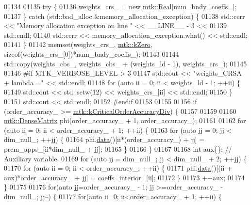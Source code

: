 \begin{DoxyCode}
{{01134 
01135   \textcolor{keywordflow}{try} \{
01136     weights\_crs\_ = \textcolor{keyword}{new} \hyperlink{group__c01-roots_gac080bbbf5cbb5502c9f00405f894857d}{mtk::Real}[num\_bndy\_coeffs\_];
01137   \} \textcolor{keywordflow}{catch} (std::bad\_alloc &memory\_allocation\_exception) \{
01138     std::cerr << \textcolor{stringliteral}{"Memory allocation exception on line "} << \_\_LINE\_\_ - 3 <<
01139       std::endl;
01140     std::cerr << memory\_allocation\_exception.what() << std::endl;
01141   \}
01142   memset(weights\_crs\_, \hyperlink{group__c01-roots_ga59a451a5fae30d59649bcda274fea271}{mtk::kZero}, \textcolor{keyword}{sizeof}(weights\_crs\_[0])*num\_bndy\_coeffs\_);
01143 
01144   std::copy(weights\_cbs\_, weights\_cbs\_ + (weights\_ld - 1), weights\_crs\_);
01145 
01146 \textcolor{preprocessor}{  #if MTK\_VERBOSE\_LEVEL > 3}
01147   std::cout << \textcolor{stringliteral}{"weights\_CRSA + lambda ="} << std::endl;
01148   \textcolor{keywordflow}{for} (\textcolor{keyword}{auto} ii = 0; ii < weights\_ld - 1; ++ii) \{
01149     std::cout << std::setw(12) << weights\_crs\_[ii] << std::endl;
01150   \}
01151   std::cout << std::endl;
01152 \textcolor{preprocessor}{  #endif}
01153 
01155 
01156   \textcolor{keywordflow}{if} (order\_accuracy\_ >= \hyperlink{group__c01-roots_ga0898eef2108473e44a5223932d571c31}{mtk::kCriticalOrderAccuracyDiv}) \{
01157 
01159 
01160     \hyperlink{classmtk_1_1DenseMatrix}{mtk::DenseMatrix} phi(order\_accuracy\_ + 1, order\_accuracy\_);
01161 
01162     \textcolor{keywordflow}{for} (\textcolor{keyword}{auto} ii = 0; ii < order\_accuracy\_ + 1; ++ii) \{
01163       \textcolor{keywordflow}{for} (\textcolor{keyword}{auto} jj = 0; jj < dim\_null\_; ++jj) \{
01164         phi.\hyperlink{classmtk_1_1DenseMatrix_a0c33b8a9e01d157c61ddbdf807c25d84}{data}()[ii*(order\_accuracy\_) + jj] = prem\_apps\_[ii*dim\_null\_ + jj];
01165       \}
01166     \}
01167 
01168     \textcolor{keywordtype}{int} aux\{\};  \textcolor{comment}{// Auxiliary variable.}
01169     \textcolor{keywordflow}{for} (\textcolor{keyword}{auto} jj = dim\_null\_; jj < dim\_null\_ + 2; ++jj) \{
01170       \textcolor{keywordflow}{for} (\textcolor{keyword}{auto} ii = 0; ii < order\_accuracy\_; ++ii) \{
01171         phi.\hyperlink{classmtk_1_1DenseMatrix_a0c33b8a9e01d157c61ddbdf807c25d84}{data}()[(ii + aux)*order\_accuracy\_ + jj] = coeffs\_interior\_[ii];
01172       \}
01173       ++aux;
01174     \}
01175 
01176     \textcolor{keywordflow}{for}(\textcolor{keyword}{auto} jj=order\_accuracy\_ - 1; jj >=order\_accuracy\_ - dim\_null\_; jj--) \{
01177       \textcolor{keywordflow}{for}(\textcolor{keyword}{auto} ii=0; ii<order\_accuracy\_ + 1; ++ii) \{
}}
\end{DoxyCode}
